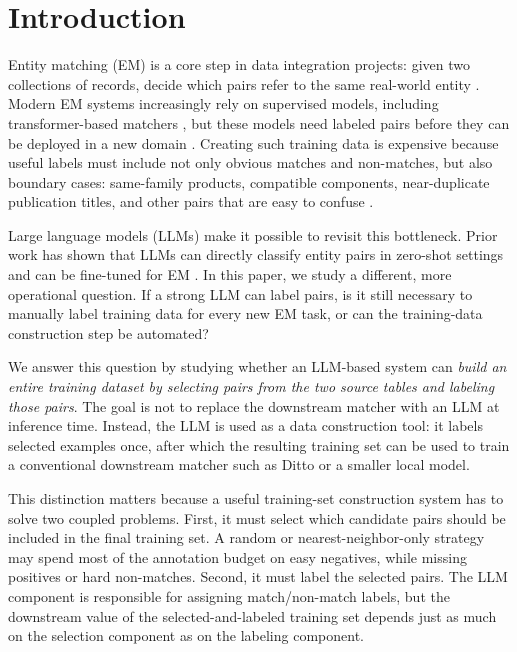 \section{Introduction}

Entity matching (EM) is a core step in data integration projects: given two collections of records, decide which pairs refer to the same real-world entity \cite{christophides2020overview,christophides2015webdata}. Modern EM systems increasingly rely on supervised models, including transformer-based matchers \cite{mudgal2018deep,brunner2020transformer,li2020ditto,barlaug2021survey}, but these models need labeled pairs before they can be deployed in a new domain \cite{konda2016magellan,peeters2024wdcproducts}. Creating such training data is expensive because useful labels must include not only obvious matches and non-matches, but also boundary cases: same-family products, compatible components, near-duplicate publication titles, and other pairs that are easy to confuse \cite{christen2012data,peeters2024wdcproducts}.

Large language models (LLMs) make it possible to revisit this bottleneck. Prior work has shown that LLMs can directly classify entity pairs in zero-shot settings and can be fine-tuned for EM \cite{peeters2025llmem,steiner2025finetuning}. In this paper, we study a different, more operational question. If a strong LLM can label pairs, is it still necessary to manually label training data for every new EM task, or can the training-data construction step be automated?

We answer this question by studying whether an LLM-based system can \emph{build an entire training dataset by selecting pairs from the two source tables and labeling those pairs}. The goal is not to replace the downstream matcher with an LLM at inference time. Instead, the LLM is used as a data construction tool: it labels selected examples once, after which the resulting training set can be used to train a conventional downstream matcher such as Ditto or a smaller local model.

This distinction matters because a useful training-set construction system has to solve two coupled problems. First, it must select which candidate pairs should be included in the final training set. A random or nearest-neighbor-only strategy may spend most of the annotation budget on easy negatives, while missing positives or hard non-matches. Second, it must label the selected pairs. The LLM component is responsible for assigning match/non-match labels, but the downstream value of the selected-and-labeled training set depends just as much on the selection component as on the labeling component.

